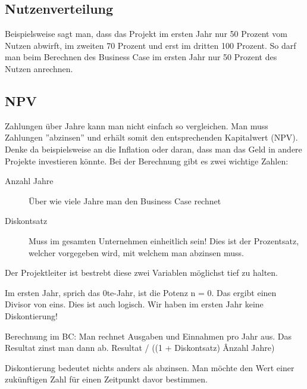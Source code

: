 \subsection{Nutzenverteilung}
Beispielsweise sagt man, dass das Projekt im ersten Jahr nur 50 Prozent vom Nutzen abwirft, im zweiten 70 Prozent und erst im dritten 100 Prozent. So darf man beim Berechnen des Business Case im ersten Jahr nur 50 Prozent des Nutzen anrechnen.

\subsection{NPV}
Zahlungen über Jahre kann man nicht einfach so vergleichen. Man muss Zahlungen ''abzinsen'' und erhält somit den entsprechenden Kapitalwert (NPV). Denke da beispielsweise an die Inflation oder daran, dass man das Geld in andere Projekte investieren könnte. Bei der Berechnung gibt es zwei wichtige Zahlen:
\begin{description}
	\item[Anzahl Jahre] Über wie viele Jahre man den Business Case rechnet
	\item[Diskontsatz] Muss im gesamten Unternehmen einheitlich sein! Dies ist der Prozentsatz, welcher vorgegeben wird, mit welchem man abzinsen muss.
\end{description}

Der Projektleiter ist bestrebt diese zwei Variablen möglichst tief zu halten.

Im ersten Jahr, sprich das 0te-Jahr, ist die Potenz n = 0. Das ergibt einen Divisor von eins. Dies ist auch logisch. Wir haben im ersten Jahr keine Diskontierung!

Berechnung im BC: Man rechnet Ausgaben und Einnahmen pro Jahr aus. Das Resultat zinst man dann ab. Resultat / ((1 + Diskontsatz) \^ Anzahl Jahre)

Diskontierung bedeutet nichts anders als abzinsen. Man möchte den Wert einer zukünftigen Zahl für einen Zeitpunkt davor bestimmen.